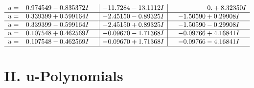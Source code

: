 \documentclass[1p]{elsarticle_modified}
\theoremstyle{definition}
\begin{document}
$$\begin{array}{c|c|c}
\begin{aligned}
u &= \phantom{-}0.974549 - 0.835372 I\end{aligned}
 & -11.7284 - 13.1112 I & \phantom{-0.000000 -}0. + 8.32350 I \\ \hline\begin{aligned}
u &= \phantom{-}0.339399 + 0.599164 I\end{aligned}
 & -2.45150 - 0.89325 I & -1.50590 + 0.29908 I \\ \hline\begin{aligned}
u &= \phantom{-}0.339399 - 0.599164 I\end{aligned}
 & -2.45150 + 0.89325 I & -1.50590 - 0.29908 I \\ \hline\begin{aligned}
u &= \phantom{-}0.107548 + 0.462569 I\end{aligned}
 & -0.09670 - 1.71368 I & -0.09766 + 4.16841 I \\ \hline\begin{aligned}
u &= \phantom{-}0.107548 - 0.462569 I\end{aligned}
 & -0.09670 + 1.71368 I & -0.09766 - 4.16841 I\\
 \hline 
 \end{array}$$\newpage
\newpage\renewcommand{\arraystretch}{1}
\centering \section*{ II. u-Polynomials}
\end{document}
